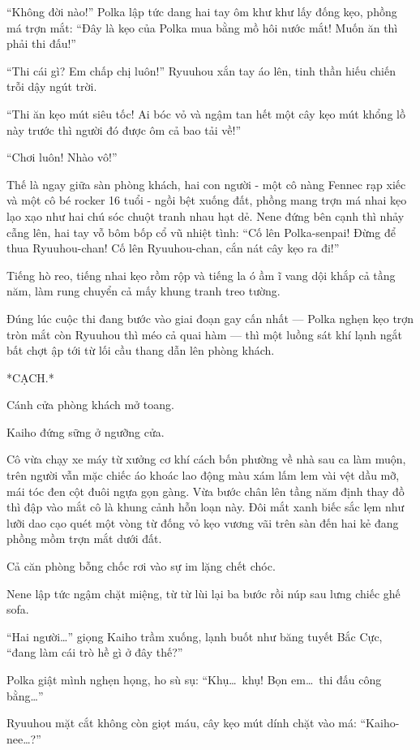 \documentclass[../main.tex]{subfiles}
\begin{document}
``Không đời nào!'' Polka lập tức dang hai tay ôm khư khư lấy đống kẹo, phồng má trợn mắt: ``Đây là kẹo của Polka mua bằng mồ hôi nước mắt! Muốn ăn thì phải thi đấu!''

``Thi cái gì? Em chấp chị luôn!'' Ryuuhou xắn tay áo lên, tinh thần hiếu chiến trỗi dậy ngút trời.

``Thi ăn kẹo mút siêu tốc! Ai bóc vỏ và ngậm tan hết một cây kẹo mút khổng lồ này trước thì người đó được ôm cả bao tải về!''

``Chơi luôn! Nhào vô!''

Thế là ngay giữa sàn phòng khách, hai con người - một cô nàng Fennec rạp xiếc và một cô bé rocker 16 tuổi - ngồi bệt xuống đất, phồng mang trợn má nhai kẹo lạo xạo như hai chú sóc chuột tranh nhau hạt dẻ. Nene đứng bên cạnh thì nhảy cẫng lên, hai tay vỗ bôm bốp cổ vũ nhiệt tình: ``Cố lên Polka-senpai! Đừng để thua Ryuuhou-chan! Cố lên Ryuuhou-chan, cắn nát cây kẹo ra đi!''

Tiếng hò reo, tiếng nhai kẹo rồm rộp và tiếng la ó ầm ĩ vang dội khắp cả tầng năm, làm rung chuyển cả mấy khung tranh treo tường.

Đúng lúc cuộc thi đang bước vào giai đoạn gay cấn nhất — Polka nghẹn kẹo trợn tròn mắt còn Ryuuhou thì méo cả quai hàm — thì một luồng sát khí lạnh ngắt bất chợt ập tới từ lối cầu thang dẫn lên phòng khách.

*CẠCH.*

Cánh cửa phòng khách mở toang.

Kaiho đứng sững ở ngưỡng cửa.

Cô vừa chạy xe máy từ xưởng cơ khí cách bốn phường về nhà sau ca làm muộn, trên người vẫn mặc chiếc áo khoác lao động màu xám lấm lem vài vệt dầu mỡ, mái tóc đen cột đuôi ngựa gọn gàng. Vừa bước chân lên tầng năm định thay đồ thì đập vào mắt cô là khung cảnh hỗn loạn này. Đôi mắt xanh biếc sắc lẹm như lưỡi dao cạo quét một vòng từ đống vỏ kẹo vương vãi trên sàn đến hai kẻ đang phồng mồm trợn mắt dưới đất.

Cả căn phòng bỗng chốc rơi vào sự im lặng chết chóc.

Nene lập tức ngậm chặt miệng, từ từ lùi lại ba bước rồi núp sau lưng chiếc ghế sofa.

``Hai người\dots'' giọng Kaiho trầm xuống, lạnh buốt như băng tuyết Bắc Cực, ``đang làm cái trò hề gì ở đây thế?''

Polka giật mình nghẹn họng, ho sù sụ: ``Khụ\dots\ khụ! Bọn em\dots\ thi đấu công bằng\dots''

Ryuuhou mặt cắt không còn giọt máu, cây kẹo mút dính chặt vào má: ``Kaiho-nee\dots?''
\end{document}
